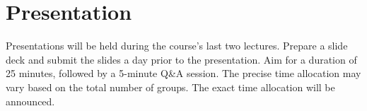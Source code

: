 \documentclass{article}
\begin{document}
\section{Presentation}
Presentations will be held during the course's last two lectures. Prepare a slide deck and submit the slides a day prior to the presentation. Aim for a duration of 25 minutes, followed by a 5-minute Q\&A session. The precise time allocation may vary based on the total number of groups. The exact time allocation will be announced.





\end{document}
